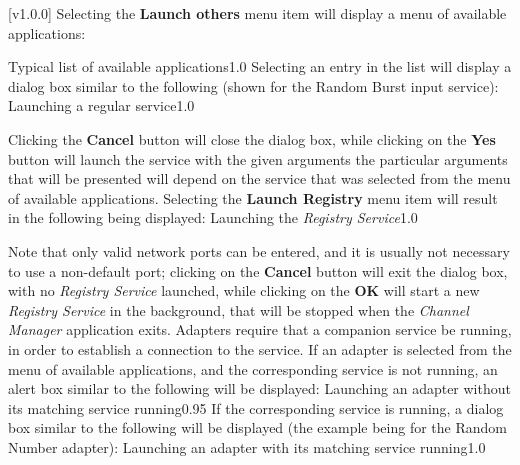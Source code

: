 [v1.0.0]
Selecting the \textbf{Launch others \textellipsis} menu item will display a menu of
available applications:

%
{Typical list of available applications}{1.0}
\clearpage
Selecting an entry in the list will display a dialog box similar to the following (shown
for the Random Burst input service):
%
{Launching a regular service}{1.0}

Clicking the \textbf{Cancel} button will close the dialog box, while clicking on the
\textbf{Yes} button will launch the service with the given arguments \longDash{} the
particular arguments that will be presented will depend on the service that was selected
from the menu of available applications.
\secondaryEnd{}
\clearpage
{}
Selecting the \textbf{Launch Registry} menu item will result in the following being
displayed:
%
{Launching the \emph{Registry Service}}{1.0}

Note that only valid network ports can be entered, and it is usually not necessary to use
a non-default port; clicking on the \textbf{Cancel} button will exit the dialog box, with
no \emph{Registry Service} launched, while clicking on the \textbf{OK} will start a new
\emph{Registry Service} in the background, that will be stopped when the
\emph{Channel Manager} application exits.
\secondaryEnd{}
Adapters require that a companion service be running, in order to establish a connection
to the service.
If an adapter is selected from the menu of available applications, and the corresponding
service is not running, an alert box similar to the following will be displayed:
%
{Launching an adapter without its matching service running}{0.95}
\clearpage
If the corresponding service is running, a dialog box similar to the following will be
displayed (the example being for the Random Number adapter):
%
{Launching an adapter with its matching service running}{1.0}

